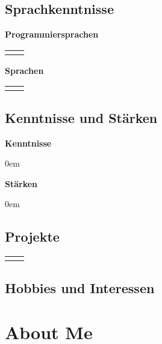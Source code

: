 \documentclass[
	a4paper,
	fontsize=12
]{scrartcl}
\begin{document}
\subsection{Sprachkenntnisse}
\begin{minipage}[t]{0.5\textwidth}
	\textbf{Programmiersprachen}\\\medskip
	\begin{tabularx}{\textwidth}{l!{\color{RoyalBlue}\vrule}X}
		\CVProgLangs
	\end{tabularx}
\end{minipage}
\begin{minipage}[t]{0.5\textwidth}
	\textbf{Sprachen}\\\medskip
	\begin{tabularx}{\textwidth}{l!{\color{RoyalBlue}\vrule}X}
		\CVNatLangs
	\end{tabularx}
\end{minipage}

\subsection{Kenntnisse und Stärken}
\begin{minipage}[t]{0.5\textwidth}
	\textbf{Kenntnisse}	
	\begin{itemize}\itemsep0em
		\CVKnowledge
	\end{itemize}
\end{minipage}
\BlueVLine{ }
\begin{minipage}[t]{0.5\textwidth}
	\textbf{Stärken}
	\begin{itemize}\itemsep0em 
		\CVStrength
	\end{itemize}
\end{minipage}

\filbreak
\subsection{Projekte}
	\begin{tabularx}{\textwidth}{l!{\color{RoyalBlue}\vrule}X}
		\CVProjects
	\end{tabularx}

\subsection{Hobbies und Interessen}
	\CVHobbiesInterests
\newpage

\endgroup %

\section{About Me}
\RecpSalutation
\bigskip
\end{document}
